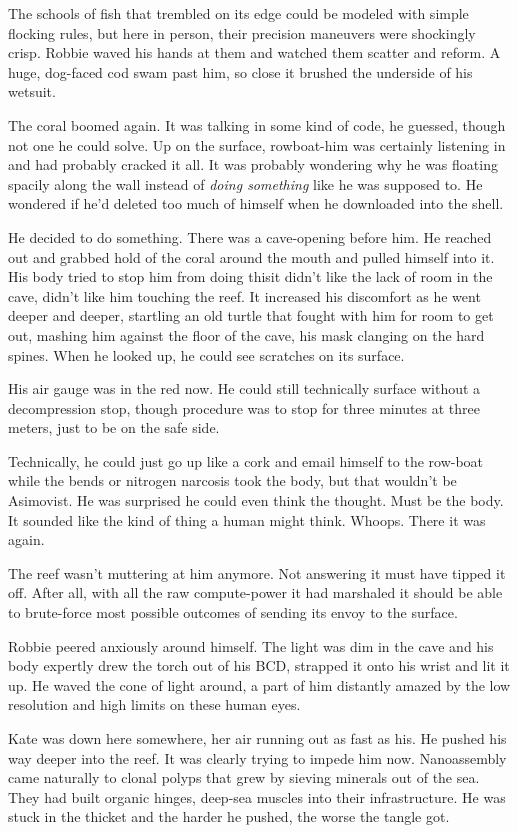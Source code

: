 The schools of fish that trembled on its edge could be modeled with
simple flocking rules, but here in person, their precision
maneuvers were shockingly crisp. Robbie waved his hands at them and
watched them scatter and reform. A huge, dog-faced cod swam past
him, so close it brushed the underside of his wetsuit.

The coral boomed again. It was talking in some kind of code, he
guessed, though not one he could solve. Up on the surface,
rowboat-him was certainly listening in and had probably cracked it
all. It was probably wondering why he was floating spacily along
the wall instead of \emph{doing something} like he was supposed to.
He wondered if he’d deleted too much of himself when he downloaded
into the shell.

He decided to do something. There was a cave-opening before him. He
reached out and grabbed hold of the coral around the mouth and
pulled himself into it. His body tried to stop him from doing
this\dash{}it didn’t like the lack of room in the cave, didn’t like him
touching the reef. It increased his discomfort as he went deeper
and deeper, startling an old turtle that fought with him for room
to get out, mashing him against the floor of the cave, his mask
clanging on the hard spines. When he looked up, he could see
scratches on its surface.

His air gauge was in the red now. He could still technically
surface without a decompression stop, though procedure was to stop
for three minutes at three meters, just to be on the safe side.

Technically, he could just go up like a cork and email himself to
the row-boat while the bends or nitrogen narcosis took the body,
but that wouldn’t be Asimovist. He was surprised he could even
think the thought. Must be the body. It sounded like the kind of
thing a human might think. Whoops. There it was again.

The reef wasn’t muttering at him anymore. Not answering it must
have tipped it off. After all, with all the raw compute-power it
had marshaled it should be able to brute-force most possible
outcomes of sending its envoy to the surface.

Robbie peered anxiously around himself. The light was dim in the
cave and his body expertly drew the torch out of his BCD, strapped
it onto his wrist and lit it up. He waved the cone of light around,
a part of him distantly amazed by the low resolution and high
limits on these human eyes.

Kate was down here somewhere, her air running out as fast as his.
He pushed his way deeper into the reef. It was clearly trying to
impede him now. Nanoassembly came naturally to clonal polyps that
grew by sieving minerals out of the sea. They had built organic
hinges, deep-sea muscles into their infrastructure. He was stuck in
the thicket and the harder he pushed, the worse the tangle got.

